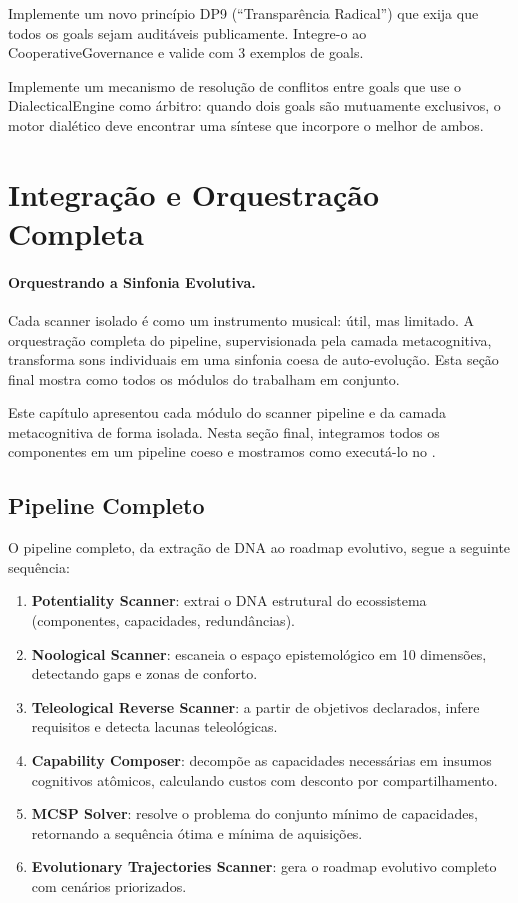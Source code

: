\begin{exercicio}
Implemente um novo princípio DP9 (``Transparência Radical'') que exija
que todos os goals sejam auditáveis publicamente. Integre-o ao
CooperativeGovernance e valide com 3 exemplos de goals.
\end{exercicio}

\begin{exercicio}
Implemente um mecanismo de resolução de conflitos entre goals que use o
DialecticalEngine como árbitro: quando dois goals são mutuamente
exclusivos, o motor dialético deve encontrar uma síntese que incorpore
o melhor de ambos.
\end{exercicio}

\section{Integração e Orquestração Completa}
\label{sec:integracao-orquestracao}
\nivelavancado

\paragraph{Orquestrando a Sinfonia Evolutiva.} Cada scanner isolado é como um instrumento musical: útil, mas limitado. A orquestração completa do pipeline, supervisionada pela camada metacognitiva, transforma sons individuais em uma sinfonia coesa de auto-evolução. Esta seção final mostra como todos os módulos do \opencodeeco{} trabalham em conjunto.

Este capítulo apresentou cada módulo do scanner pipeline e da camada
metacognitiva de forma isolada. Nesta seção final, integramos todos os
componentes em um pipeline coeso e mostramos como executá-lo no
\opencodeeco{}.

\subsection{Pipeline Completo}

O pipeline completo, da extração de DNA ao roadmap evolutivo, segue a
seguinte sequência:

\begin{enumerate}
\item \textbf{Potentiality Scanner}: extrai o DNA estrutural do
ecossistema (componentes, capacidades, redundâncias).
\item \textbf{Noological Scanner}: escaneia o espaço epistemológico em
10 dimensões, detectando gaps e zonas de conforto.
\item \textbf{Teleological Reverse Scanner}: a partir de objetivos
declarados, infere requisitos e detecta lacunas teleológicas.
\item \textbf{Capability Composer}: decompõe as capacidades necessárias
em insumos cognitivos atômicos, calculando custos com desconto por
compartilhamento.
\item \textbf{MCSP Solver}: resolve o problema do conjunto mínimo de
capacidades, retornando a sequência ótima e mínima de aquisições.
\item \textbf{Evolutionary Trajectories Scanner}: gera o roadmap
evolutivo completo com cenários priorizados.
\end{enumerate}

